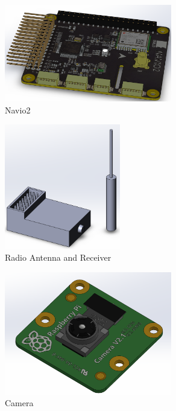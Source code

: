 \documentclass[12pt, titlepage]{article}
\begin{document}
\begin{figure}[h!]
  \begin{center} 
  \caption{Navio2}
  \label{Navio2}
        \includegraphics[width=0.65\textwidth]{CAD_Navio2.png}
  \end{center}
\end{figure}

\begin{figure}[h!]
  \begin{center} 
  \caption{Radio Antenna and Receiver}
  \label{Radio Antenna and Receiver}
        \includegraphics[width=0.45\textwidth]{CAD_Radio.png}
  \end{center}
\end{figure}

\begin{figure}[h!]
  \begin{center} 
  \caption{Camera}
  \label{Camera}
        \includegraphics[width=0.65\textwidth]{CAD_Camera.png}
  \end{center}
\end{figure}
\end{document}

